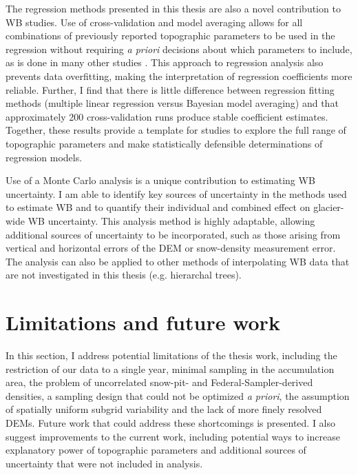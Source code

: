 \documentclass{sfuthesis}
\begin{document}
{The regression methods presented in this thesis are also a novel contribution to WB studies. Use of cross-validation and model averaging allows for all combinations of previously reported topographic parameters to be used in the regression without requiring \textit{a priori} decisions about which parameters to include, as is done in many other studies \citep[e.g.][]{Wheler2014}. This approach to regression analysis also prevents data overfitting, making the interpretation of regression coefficients more reliable. Further, I find that there is little difference between regression fitting methods (multiple linear regression versus Bayesian model averaging) and that approximately 200 cross-validation runs produce stable coefficient estimates. Together, these results provide a template for studies to explore the full range of topographic parameters and make statistically defensible determinations of regression models.

Use of a Monte Carlo analysis is a unique contribution to estimating WB uncertainty. I am able to identify key sources of uncertainty in the methods used to estimate WB and to quantify their individual and combined effect on glacier-wide WB uncertainty. This analysis method is highly adaptable, allowing additional sources of uncertainty to be incorporated, such as those arising from vertical and horizontal errors of the DEM or snow-density measurement error. The analysis can also be applied to other methods of interpolating WB data that are not investigated in this thesis (e.g. hierarchal trees). 

\section{Limitations and future work}

In this section, I address potential limitations of the thesis work, including the restriction of our data to a single year, minimal sampling in the accumulation area, the problem of uncorrelated snow-pit- and Federal-Sampler-derived densities, a sampling design that could not be optimized \textit{a priori}, the assumption of spatially uniform subgrid variability and the lack of more finely resolved DEMs. Future work that could address these shortcomings is presented. I also suggest improvements to the current work, including potential ways to increase explanatory power of topographic parameters and additional sources of uncertainty that were not included in analysis. 

}
\end{document}
